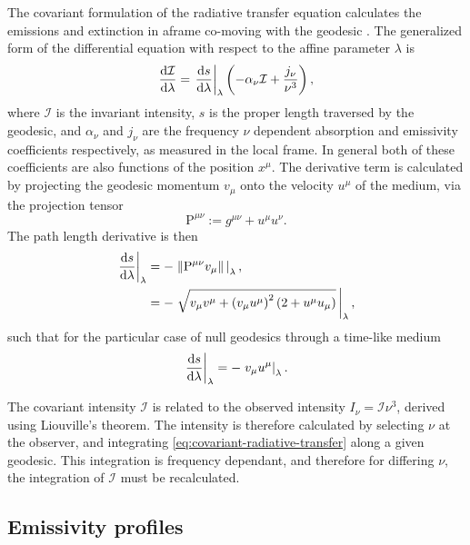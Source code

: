 The covariant formulation of the radiative transfer equation calculates the emissions and extinction in aframe co-moving with the geodesic \citep{fuerst_radiation_2004,younsi_general_2012}. The generalized form of the differential equation with respect to the affine parameter $\lambda$ is
\begin{equation}
    \label{eq:covariant-radiative-transfer}
    \frac{\text{d} \mathcal{I}}{\text{d} \lambda} = \left. \frac{\text{d} s}{\text{d} \lambda} \right\rvert_\lambda \left( -\alpha_\nu \mathcal{I} + \frac{j_\nu}{\nu^3} \right),
\end{equation}
where $\mathcal{I}$ is the invariant intensity, $s$ is the proper length traversed by the geodesic, and $\alpha_\nu$ and $j_\nu$ are the frequency $\nu$ dependent absorption and emissivity coefficients respectively, as measured in the local frame. In general both of these coefficients are also functions of the position $x^\mu$. The derivative term is calculated by projecting the geodesic momentum $v_\mu$ onto the velocity $u^\mu$ of the medium, via the projection tensor
\begin{equation}
    \mathrm{P}^{\mu\nu} := g^{\mu\nu} + u^\mu u^\nu.
\end{equation}
The path length derivative is then
\begin{align}
    \left. \frac{\text{d} s}{\text{d} \lambda} \right\rvert_\lambda
    &= - \left. \left\lVert \mathrm{P}^{\mu\nu} v_\mu\right\rVert\, \right\rvert_\lambda,\\
    &= - \left. \sqrt{v_\mu v^\mu + \left(v_\mu u^\mu\right)^2 \left(2 + u^\mu u_\mu\right)} \, \right\rvert_\lambda,
\end{align}
such that for the particular case of null geodesics through a time-like medium
\begin{equation}
    \left. \frac{\text{d} s}{\text{d} \lambda} \right\rvert_\lambda = - \left. v_\mu u^\mu \right\rvert_\lambda.
\end{equation}

The covariant intensity $\mathcal{I}$ is related to the observed intensity $I_\nu = \mathcal{I} \nu^3$, derived using Liouville's theorem. The intensity is therefore calculated by selecting $\nu$ at the observer, and integrating \eqref{eq:covariant-radiative-transfer} along a given geodesic. This integration is frequency dependant, and therefore for differing $\nu$, the integration of $\mathcal{I}$ must be recalculated.


\subsection{Emissivity profiles}


